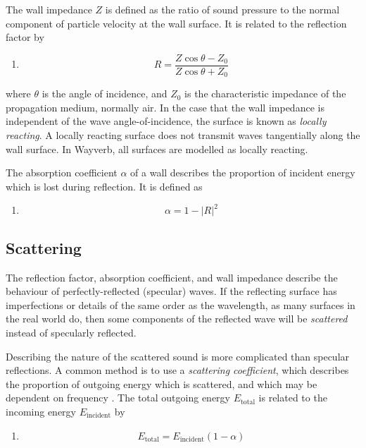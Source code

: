 \documentclass[]{scrreprt}
\providecommand{\tightlist}{%
  \setlength{\itemsep}{0pt}\setlength{\parskip}{0pt}}
\begin{document}
The wall impedance \(Z\) is defined as the ratio of sound pressure to
the normal component of particle velocity at the wall surface. It is
related to the reflection factor by

\begin{enumerate}
\def\labelenumi{(\arabic{enumi})}
\setcounter{enumi}{34}
\tightlist
\item
  \[R=\frac{Z\cos\theta-Z_0}{Z\cos\theta+Z_0}\]
\end{enumerate}

where \(\theta\) is the angle of incidence, and \(Z_0\) is the
characteristic impedance of the propagation medium, normally air. In the
case that the wall impedance is independent of the wave
angle-of-incidence, the surface is known as \emph{locally reacting}. A
locally reacting surface does not transmit waves tangentially along the
wall surface. In Wayverb, all surfaces are modelled as locally reacting.

The absorption coefficient \(\alpha\) of a wall describes the proportion
of incident energy which is lost during reflection. It is defined as

\begin{enumerate}
\def\labelenumi{(\arabic{enumi})}
\setcounter{enumi}{35}
\tightlist
\item
  \[\alpha =1-|R|^2\]
\end{enumerate}

\subsection{Scattering}\label{scattering}

The reflection factor, absorption coefficient, and wall impedance
describe the behaviour of perfectly-reflected (specular) waves. If the
reflecting surface has imperfections or details of the same order as the
wavelength, as many surfaces in the real world do, then some components
of the reflected wave will be \emph{scattered} instead of specularly
reflected.

Describing the nature of the scattered sound is more complicated than
specular reflections. A common method is to use a \emph{scattering
coefficient}, which describes the proportion of outgoing energy which is
scattered, and which may be dependent on frequency
. The total outgoing energy
\(E_\text{total}\) is related to the incoming energy
\(E_\text{incident}\) by

\begin{enumerate}
\def\labelenumi{(\arabic{enumi})}
\setcounter{enumi}{36}
\tightlist
\item
  \[E_{\text{total}}=E_{\text{incident}}(1-\alpha)\]
\end{enumerate}
\end{document}
